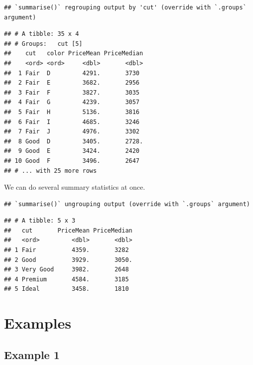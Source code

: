 \documentclass[
]{book}
\newenvironment{Shaded}{\begin{snugshade}}{\end{snugshade}}
\newcommand{\DataTypeTok}[1]{\textcolor[rgb]{0.13,0.29,0.53}{#1}}
\newcommand{\KeywordTok}[1]{\textcolor[rgb]{0.13,0.29,0.53}{\textbf{#1}}}
\newcommand{\NormalTok}[1]{#1}
\newcommand{\OperatorTok}[1]{\textcolor[rgb]{0.81,0.36,0.00}{\textbf{#1}}}
\newcommand{\StringTok}[1]{\textcolor[rgb]{0.31,0.60,0.02}{#1}}
\begin{document}
\begin{verbatim}
## `summarise()` regrouping output by 'cut' (override with `.groups` argument)
\end{verbatim}

\begin{verbatim}
## # A tibble: 35 x 4
## # Groups:   cut [5]
##    cut   color PriceMean PriceMedian
##    <ord> <ord>     <dbl>       <dbl>
##  1 Fair  D         4291.       3730 
##  2 Fair  E         3682.       2956 
##  3 Fair  F         3827.       3035 
##  4 Fair  G         4239.       3057 
##  5 Fair  H         5136.       3816 
##  6 Fair  I         4685.       3246 
##  7 Fair  J         4976.       3302 
##  8 Good  D         3405.       2728.
##  9 Good  E         3424.       2420 
## 10 Good  F         3496.       2647 
## # ... with 25 more rows
\end{verbatim}

We can do several summary statistics at once.

\begin{Shaded}
\end{Shaded}

\begin{verbatim}
## `summarise()` ungrouping output (override with `.groups` argument)
\end{verbatim}

\begin{verbatim}
## # A tibble: 5 x 3
##   cut       PriceMean PriceMedian
##   <ord>         <dbl>       <dbl>
## 1 Fair          4359.       3282 
## 2 Good          3929.       3050.
## 3 Very Good     3982.       2648 
## 4 Premium       4584.       3185 
## 5 Ideal         3458.       1810
\end{verbatim}

\hypertarget{examples-2}{%
\section{Examples}\label{examples-2}}

\hypertarget{example-1-1}{%
\subsection{Example 1}\label{example-1-1}}
\end{document}
